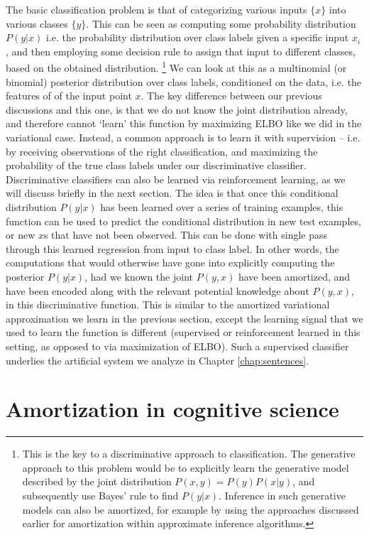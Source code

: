 The basic classification problem is that of categorizing various inputs $\{x\}$ into various classes $\{y\}$. This can be seen as computing some probability distribution $P(y | x)$ i.e. the probability distribution over class labels given a specific input $x_i$, and then employing some decision rule to assign that input to different classes, based on the obtained distribution. \footnote{This is the key to a discriminative approach to classification. The generative approach to this problem would be to explicitly learn the generative model described by the joint distribution $P(x, y) = P(y) P(x | y)$, and subsequently use Bayes' rule to find $P(y | x)$.  Inference in such generative models can also be amortized, for example by using the approaches discussed earlier for amortization within approximate inference algorithms. } We can look at this as a multinomial (or binomial) posterior distribution over class labels, conditioned on the data, i.e. the features of of the input point $x$. The key difference between our previous discussions and this one, is that we do not know the joint distribution already, and therefore cannot `learn' this function by maximizing ELBO like we did in the variational case. Instead, a common approach is to learn it with supervision -- i.e. by receiving observations of the right classification, and maximizing the probability of the true class labels under our discriminative classifier. Discriminative classifiers can also be learned via reinforcement learning, as we will discuss briefly in the next section. The idea is that once this conditional distribution $P(y | x)$ has been learned over a series of training examples, this function can be used to predict the conditional distribution in new test examples, or new $x$s that have not been observed. This can be done with single pass through this learned regression from input to class label. In other words, the computations that would otherwise have gone into explicitly computing the posterior $P(y | x)$, had we known the joint $P(y,x)$ have been amortized, and have been encoded along with  the relevant potential knowledge about $P(y,x)$, in this discriminative function. This is similar to the amortized variational approximation we learn in the previous section, except the learning signal that we used to learn the function is different (supervised or reinforcement learned in this setting, as opposed to via maximization of ELBO). Such a supervised classifier underlies the artificial system we analyze in Chapter \ref{chap:sentences}.

\section{Amortization in cognitive science}

